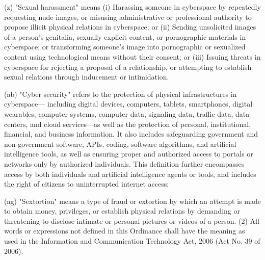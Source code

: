 (z) "Sexual harassment" means
(i) Harassing someone in cyberspace by repeatedly requesting nude images, or misusing
administrative or professional authority to propose illicit physical relations in
cyberspace; or
(ii) Sending unsolicited images of a person’s genitalia, sexually explicit content, or
pornographic materials in cyberspace; or transforming someone's image into
pornographic or sexualized content using technological means without their consent; or
(iii) Issuing threats in cyberspace for rejecting a proposal of a relationship, or attempting to
establish sexual relations through inducement or intimidation.



(ab) "Cyber security" refers to the protection of physical infrastructures in cyberspace—
including digital devices, computers, tablets, smartphones, digital wearables, computer
systems, computer data, signaling data, traffic data, data centers, and cloud services—as well
as the protection of personal, institutional, financial, and business information. It also includes
safeguarding government and non-government software, APIs, coding, software algorithms,
and artificial intelligence tools, as well as ensuring proper and authorized access to portals or
networks only by authorized individuals. This definition further encompasses access by both
individuals and artificial intelligence agents or tools, and includes the right of citizens to
uninterrupted internet access;



(ag) "Sextortion" means a type of fraud or extortion by which an attempt is made to obtain
money, privileges, or establish physical relations by demanding or threatening to disclose
intimate or personal pictures or videos of a person.
(2) All words or expressions not defined in this Ordinance shall have the meaning as used in
the Information and Communication Technology Act, 2006 (Act No. 39 of 2006).

